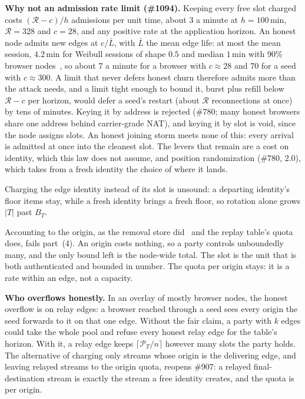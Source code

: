 \documentclass[journal]{IEEEtran}
\newcommand{\Rg}{\mathcal{R}}
\newcommand{\Pool}{\mathcal{P}}
\newcommand{\issue}[1]{\#{#1}}
\begin{document}
\textbf{Why not an admission rate limit (\issue{1094}).}  Keeping every free slot charged costs
$(\Rg-c)/h$ admissions per unit time, about $3$ a minute at $h=100$\,min, $\Rg=328$ and $c=28$,
and any positive rate at the application horizon.  An honest node admits new edges at $c/\bar L$,
with $\bar L$ the mean edge life: at most the mean session, $4.2$\,min for Weibull sessions of
shape $0.5$ and median $1$\,min with 90\% browser nodes~\cite{DurableRecords}, so about $7$ a
minute for a browser with $c\approx28$ and $70$ for a seed with $c\approx300$.  A limit that never
defers honest churn therefore admits more than the attack needs, and a limit tight enough to
bound it, burst plus refill below $\Rg-c$ per horizon, would defer a seed's restart (about $\Rg$
reconnections at once) by tens of minutes.  Keying it by address is rejected (\issue{780}; many
honest browsers share one address behind carrier-grade NAT), and keying it by slot is void, since
the node assigns slots.  An honest joining storm meets none of this: every arrival is admitted at
once into the cleanest slot.  The levers that remain are a cost on identity, which this law does
not assume, and position randomization (\issue{780}, 2.0), which takes from a fresh identity the
choice of where it lands.

Charging the edge identity instead of its slot is unsound: a departing identity's floor items
stay, while a fresh identity brings a fresh floor, so rotation alone grows $|T|$ past $B_T$.

Accounting to the origin, as the removal store did~\cite{RemovalStability} and the replay
table's quota does, fails part~(4).  An origin costs nothing, so a party controls unboundedly
many, and the only bound left is the node-wide total.  The slot is the unit that is both
authenticated and bounded in number.  The quota per origin stays: it is a rate within an edge,
not a capacity.

\textbf{Who overflows honestly.}  In an overlay of mostly browser nodes, the honest overflow is
on relay edges: a browser reached through a seed sees every origin the seed forwards to it on
that one edge.  Without the fair claim, a party with $k$ edges could take the whole pool and
refuse every honest relay edge for the table's horizon.  With it, a relay edge keeps
$\lceil\Pool_T/n\rceil$ however many slots the party holds.  The alternative of charging only
streams whose origin is the delivering edge, and leaving relayed streams to the origin quota,
reopens \issue{907}: a relayed final-destination stream is exactly the stream a free identity
creates, and the quota is per origin.
\end{document}
